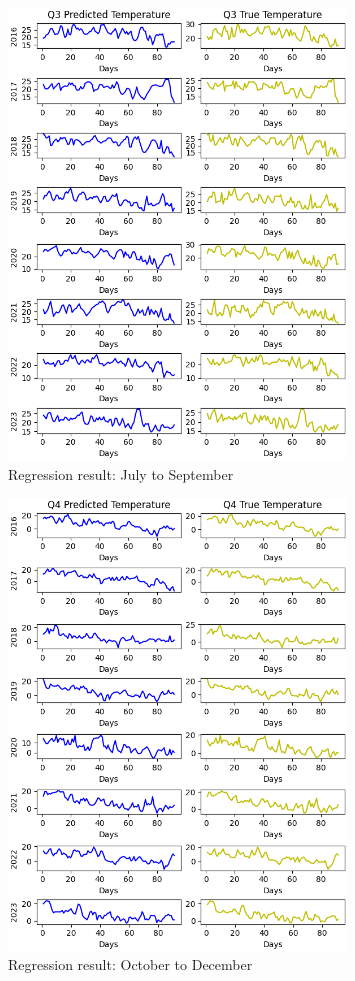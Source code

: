 \documentclass[12pt]{article}
\begin{document}
\begin{figure}[htpb]
	\centering
	\includegraphics[width=0.8\textwidth]{pic/Predicted-and-Tested-InSeq_3.png}
	\caption{Regression result: July to September}
	\label{Fig:pred-3}
\end{figure}

\begin{figure}[htpb]
	\centering
	\includegraphics[width=0.8\textwidth]{pic/Predicted-and-Tested-InSeq_4.png}
	\caption{Regression result: October to December}
	\label{Fig:pred-4}
\end{figure}
\end{document}
